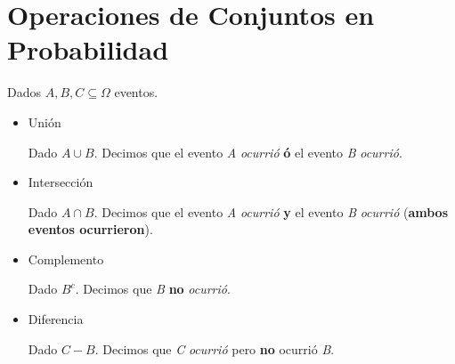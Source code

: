 \section{Operaciones de Conjuntos en Probabilidad}

Dados $A, B, C \subseteq \Omega$ eventos.
\begin{itemize}
  \item Unión

    Dado $A \cup B$. Decimos que el evento \textit{A} \textit{ocurrió} \textbf{ó} el evento \textit{B} \textit{ocurrió}.
  \item Intersección

    Dado $A \cap B$. Decimos que el evento \textit{A} \textit{ocurrió} \textbf{y} el evento \textit{B} \textit{ocurrió} (\textbf{ambos eventos ocurrieron}).
  \item Complemento

    Dado $B^c$. Decimos que \textit{B} \textbf{no} \textit{ocurrió}.
  \item Diferencia

    Dado $C - B$. Decimos que \textit{C} \textit{ocurrió} pero \textbf{no} ocurrió \textit{B}.
\end{itemize}

